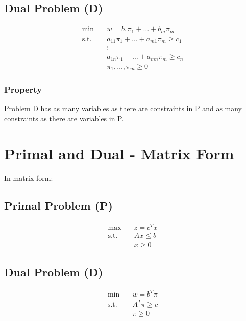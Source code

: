 \documentclass[a4paper, 11pt]{article}
\begin{document}
\subsection{Dual Problem (D)}

\begin{align*}
\min & \quad w = b_{1} \pi_{1} + \dots + b_{m} \pi_{m} \\
\text{s.t.} & \quad a_{11} \pi_{1} + \dots + a_{m1} \pi_{m} \geq c_{1} \\
& \quad \vdots \\
& \quad a_{1n} \pi_{1} + \dots + a_{mn} \pi_{m} \geq c_{n} \\
& \quad \pi_{1}, \dots, \pi_{m} \geq 0
\end{align*}

\subsubsection*{Property}
Problem D has as many variables as there are constraints in P and as many constraints as there are variables in P.

\section{Primal and Dual - Matrix Form}

In matrix form:

\subsection{Primal Problem (P)}

\begin{align*}
\max & \quad z = c^{T} x \\
\text{s.t.} & \quad A x \leq b \\
& \quad x \geq 0
\end{align*}

\subsection{Dual Problem (D)}

\begin{align*}
\min & \quad w = b^{T} \pi \\
\text{s.t.} & \quad A^{T} \pi \geq c \\
& \quad \pi \geq 0
\end{align*} 
\end{document}
